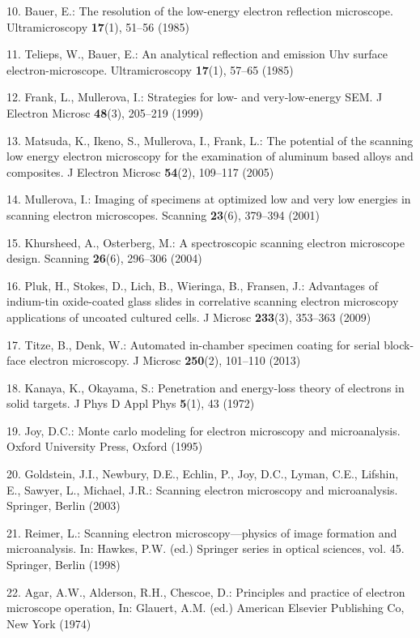 \documentclass{article}
\begin{document}
\begin{hangpars}
10. Bauer, E.: The resolution of the low-energy electron reflection microscope. Ultramicroscopy \textbf{17}(1), 51–56 (1985)

11. Telieps, W., Bauer, E.: An analytical reflection and emission Uhv surface electron-microscope. Ultramicroscopy \textbf{17}(1), 57–65 (1985)

12. Frank, L., Mullerova, I.: Strategies for low- and very-low-energy SEM. J Electron Microsc \textbf{48}(3), 205–219 (1999)

13. Matsuda, K., Ikeno, S., Mullerova, I., Frank, L.: The potential of the scanning low energy electron microscopy for the examination of aluminum based alloys and composites. J Electron Microsc \textbf{54}(2), 109–117 (2005)

14. Mullerova, I.: Imaging of specimens at optimized low and very low energies in scanning electron microscopes. Scanning \textbf{23}(6), 379–394 (2001)

15. Khursheed, A., Osterberg, M.: A spectroscopic scanning electron microscope design. Scanning \textbf{26}(6), 296–306 (2004)

16. Pluk, H., Stokes, D., Lich, B., Wieringa, B., Fransen, J.: Advantages of indium-tin oxide-coated glass slides in correlative scanning electron microscopy applications of uncoated cultured cells. J Microsc \textbf{233}(3), 353–363 (2009)

17. Titze, B., Denk, W.: Automated in-chamber specimen coating for serial block-face electron microscopy. J Microsc \textbf{250}(2), 101–110 (2013)

18. Kanaya, K., Okayama, S.: Penetration and energy-loss theory of electrons in solid targets. J Phys D Appl Phys \textbf{5}(1), 43 (1972)

19. Joy, D.C.: Monte carlo modeling for electron microscopy and microanalysis. Oxford University Press, Oxford (1995)

20. Goldstein, J.I., Newbury, D.E., Echlin, P., Joy, D.C., Lyman, C.E., Lifshin, E., Sawyer, L., Michael, J.R.: Scanning electron microscopy and microanalysis. Springer, Berlin (2003)

21. Reimer, L.: Scanning electron microscopy—physics of image formation and microanalysis. In: Hawkes, P.W. (ed.) Springer series in optical sciences, vol. 45. Springer, Berlin (1998)

22. Agar, A.W., Alderson, R.H., Chescoe, D.: Principles and practice of electron microscope operation, In: Glauert, A.M. (ed.) American Elsevier Publishing Co, New York (1974)


\end{hangpars}
\end{document}
